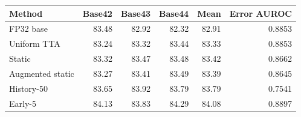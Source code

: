 \begin{tabular}{lrrrrr}
\toprule
Method & Base42 & Base43 & Base44 & Mean & Error AUROC \\
\midrule
FP32 base & 83.48 & 82.92 & 82.32 & 82.91 & 0.8853 \\
Uniform TTA & 83.24 & 83.32 & 83.44 & 83.33 & 0.8853 \\
Static & 83.32 & 83.47 & 83.48 & 83.42 & 0.8662 \\
Augmented static & 83.27 & 83.41 & 83.49 & 83.39 & 0.8645 \\
History-50 & 83.65 & 83.92 & 83.79 & 83.79 & 0.7541 \\
Early-5 & 84.13 & 83.83 & 84.29 & 84.08 & 0.8897 \\
\bottomrule
\end{tabular}
